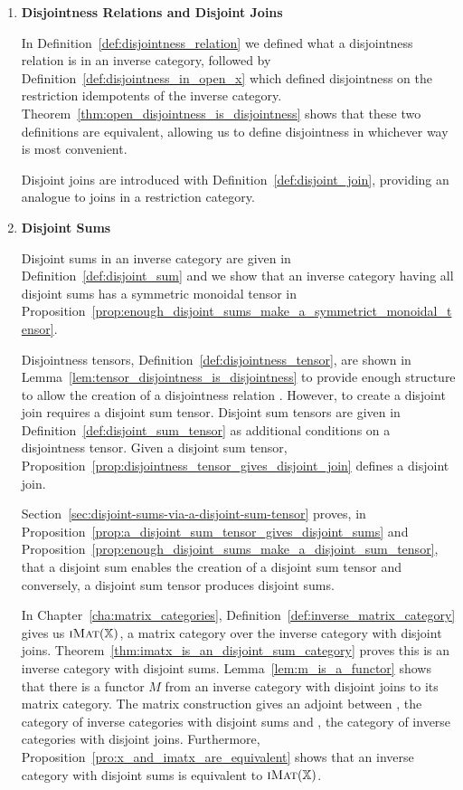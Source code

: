 \begin{enumerate}
\item \textbf{Disjointness Relations and Disjoint Joins}

In Definition~\ref{def:disjointness_relation} we defined what a disjointness relation is in an
inverse category, followed by Definition~\ref{def:disjointness_in_open_x} which defined disjointness
on the restriction idempotents of the inverse
category. Theorem~\ref{thm:open_disjointness_is_disjointness} shows that these two definitions are
equivalent, allowing us to define disjointness in whichever way is most convenient.

Disjoint joins are introduced with Definition~\ref{def:disjoint_join}, providing an analogue to
joins in a restriction category.

\item \textbf{Disjoint Sums}

Disjoint sums in an inverse category are given in Definition~\ref{def:disjoint_sum} and we show that
an inverse category having all disjoint sums has a symmetric monoidal tensor in
Proposition~\ref{prop:enough_disjoint_sums_make_a_symmetrict_monoidal_tensor}.

Disjointness tensors, Definition~\ref{def:disjointness_tensor}, are shown in
Lemma~\ref{lem:tensor_disjointness_is_disjointness} to provide enough structure to allow the
creation of a disjointness relation . However, to create a disjoint join requires a disjoint sum
tensor. Disjoint sum tensors are given in Definition~\ref{def:disjoint_sum_tensor} as additional
conditions on a disjointness tensor. Given a disjoint sum tensor,
Proposition~\ref{prop:disjointness_tensor_gives_disjoint_join} defines a disjoint join.

Section~\ref{sec:disjoint-sums-via-a-disjoint-sum-tensor} proves, in
Proposition~\ref{prop:a_disjoint_sum_tensor_gives_disjoint_sums} and
Proposition~\ref{prop:enough_disjoint_sums_make_a_disjoint_sum_tensor}, that a disjoint sum enables
the creation of a disjoint sum tensor and conversely, a disjoint sum tensor produces disjoint sums.

In Chapter~\ref{cha:matrix_categories}, Definition~\ref{def:inverse_matrix_category} gives us
$\textsc{iMat}({\mathbb{X}})$, a matrix category over the inverse category \X with disjoint
joins. Theorem~\ref{thm:imatx_is_an_disjoint_sum_category} proves this is an inverse category with
disjoint sums. Lemma~\ref{lem:m_is_a_functor} shows that there is a functor $M$ from an inverse
category with disjoint joins to its matrix category.  The matrix construction gives an adjoint
between \DSum, the category of inverse categories with disjoint sums and \DJoin, the category of
inverse categories with disjoint joins. Furthermore,
Proposition~\ref{pro:x_and_imatx_are_equivalent} shows that an inverse category \X with disjoint
sums is equivalent to $\textsc{iMat}({\mathbb{X}})$.



\end{enumerate}
